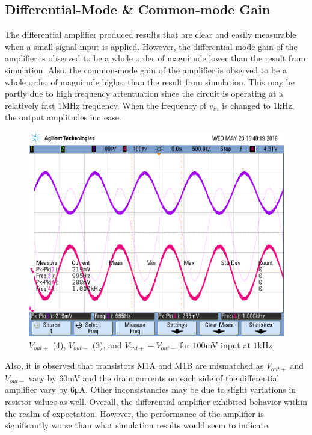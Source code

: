 \subsection{Differential-Mode \& Common-mode Gain}
The differential amplifier produced results that are clear and easily measurable when a small signal input is applied.
However, the differential-mode gain of the amplifier is observed to be a whole order of magnitude lower than the result from simulation.
Also, the common-mode gain of the amplifier is observed to be a whole order of magnirude higher than the result from simulation.
This may be partly due to high frequency attentuation since the circuit is operating at a relatively fast $1$\si{\mega\hertz} frequency. 
When the frequency of $v_{in}$ is changed to $1$\si{\kilo\hertz}, the output amplitudes increase.

\FloatBarrier

\begin{figure}[h!]
	\centering
	\includegraphics[scale=0.5]{./images/scope_2}
	\caption{$V_{out+}$ (4), $V_{out-}$ (3), and $V_{out+} - V_{out-}$ for $100$\si{\milli\volt} input at $1$\si{\kilo\hertz}}
	\label{fig:scope_2}
\end{figure}

\FloatBarrier

Also, it is observed that transistors M1A and M1B are mismatched as $V_{out+}$ and $V_{out-}$ vary by $60$\si{\milli\volt} and the drain currents on each side of the differential amplifier vary by $6$\si{\micro\ampere}.
Other inconsistancies may be due to slight variations in resistor values as well.
Overall, the differential amplifier exhibited behavior within the realm of expectation.
However, the performance of the amplifier is significantly worse than what simulation results would seem to indicate. \\



